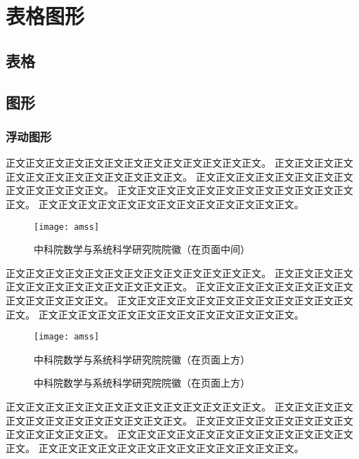 ﻿
\chapter{表格图形}
\label{chap:tabfig}

\section{表格}


\section{图形}

\subsection{浮动图形}

正文正文正文正文正文正文正文正文正文正文正文正文正文。
正文正文正文正文正文正文正文正文正文正文正文正文正文。
正文正文正文正文正文正文正文正文正文正文正文正文正文。
正文正文正文正文正文正文正文正文正文正文正文正文正文。
正文正文正文正文正文正文正文正文正文正文正文正文正文。

\begin{figure}[h]
 \centering
  \texttt{[image: amss]}
 \caption{中科院数学与系统科学研究院院徽（在页面中间）}
 \label{fig:amss1}
\end{figure}

正文正文正文正文正文正文正文正文正文正文正文正文正文。
正文正文正文正文正文正文正文正文正文正文正文正文正文。
正文正文正文正文正文正文正文正文正文正文正文正文正文。
正文正文正文正文正文正文正文正文正文正文正文正文正文。
正文正文正文正文正文正文正文正文正文正文正文正文正文。

\begin{figure}[t]
 \centering
 \texttt{[image: amss]}
 \caption{中科院数学与系统科学研究院院徽（在页面上方）}
 \label{fig:amss2}
\end{figure}

\begin{figure}[t]
 \centering
 \caption{中科院数学与系统科学研究院院徽（在页面上方）}
 \label{fig:amss2}
\end{figure}

正文正文正文正文正文正文正文正文正文正文正文正文正文。
正文正文正文正文正文正文正文正文正文正文正文正文正文。
正文正文正文正文正文正文正文正文正文正文正文正文正文。
正文正文正文正文正文正文正文正文正文正文正文正文正文。
正文正文正文正文正文正文正文正文正文正文正文正文正文。

